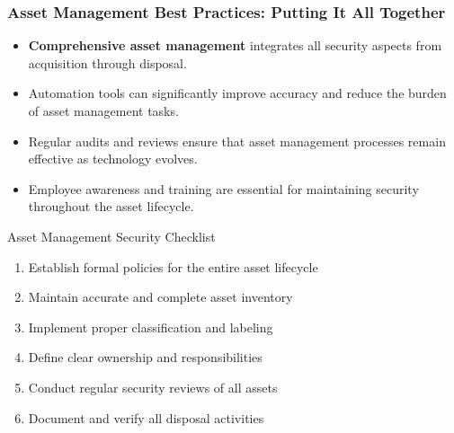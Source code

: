 \documentclass{beamer}
\begin{document}
\begin{frame}
\frametitle{Asset Management Best Practices: Putting It All Together}
\begin{itemize}
    \item \textbf{Comprehensive asset management} integrates all security aspects from acquisition through disposal.
    \item Automation tools can significantly improve accuracy and reduce the burden of asset management tasks.
    \item Regular audits and reviews ensure that asset management processes remain effective as technology evolves.
    \item Employee awareness and training are essential for maintaining security throughout the asset lifecycle.
\end{itemize}

\begin{block}{Asset Management Security Checklist}
    \scriptsize
    \begin{enumerate}
        \item Establish formal policies for the entire asset lifecycle
        \item Maintain accurate and complete asset inventory
        \item Implement proper classification and labeling
        \item Define clear ownership and responsibilities
        \item Conduct regular security reviews of all assets
        \item Document and verify all disposal activities
    \end{enumerate}
\end{block}
\end{frame}
\end{document}
